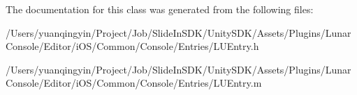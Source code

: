 The documentation for this class was generated from the following files\+:\begin{DoxyCompactItemize}
\item 
/\+Users/yuanqingyin/\+Project/\+Job/\+Slide\+In\+S\+D\+K/\+Unity\+S\+D\+K/\+Assets/\+Plugins/\+Lunar\+Console/\+Editor/i\+O\+S/\+Common/\+Console/\+Entries/L\+U\+Entry.\+h\item 
/\+Users/yuanqingyin/\+Project/\+Job/\+Slide\+In\+S\+D\+K/\+Unity\+S\+D\+K/\+Assets/\+Plugins/\+Lunar\+Console/\+Editor/i\+O\+S/\+Common/\+Console/\+Entries/L\+U\+Entry.\+m\end{DoxyCompactItemize}
